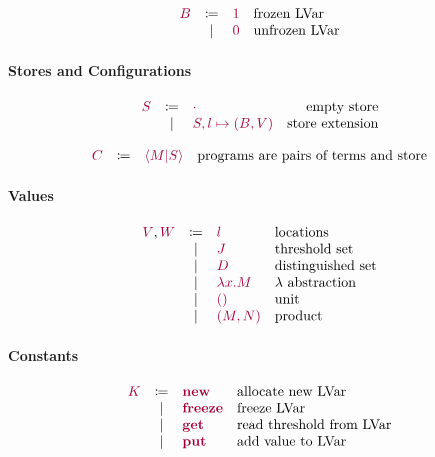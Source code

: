 \documentclass[main.tex]{subfiles}
\begin{document}
\[
\begin{array}{lcll}
  \tm{B}
  & \coloneqq & \tm{1}                        & \text{frozen LVar} \\
  & \sep      & \tm{0}                        & \text{unfrozen LVar} \\
\end{array}
\]

\paragraph{Stores and Configurations}
\[
\begin{array}{lclr}
  \tm{S}
  & \coloneqq & \tm{\emptyenv}                & \text{empty store} \\
  & \sep      & \tm{S, l \mapsto (B, V)}      & \text{store extension} \\
  \end{array}
\]

\[
\begin{array}{lclr}
  \tm{C}
  & \coloneqq & \tm{\config{M}{S}}                & \text{programs are pairs of
                                                    terms and store} \\
  \end{array}
\]

\paragraph{Values}
\[
\begin{array}{lcll}
  \tm{V}, \tm{W}
  & \coloneqq & \tm{l}                        & \text{locations} \\
  & \sep      & \tm{J}                        & \text{threshold set} \\
  & \sep      & \tm{D}                        & \text{distinguished set} \\
  & \sep      & \tm{\lambda x.M}              & \lambda \text{ abstraction} \\
  & \sep      & \tm{\unit}                    & \text{unit} \\
  & \sep      & \tm{\pair{M}{N}}              & \text{product} \\
\end{array}
\]

\paragraph{Constants}
\[
\begin{array}{lcll}
  \tm{K}
  & \coloneqq & \tm{\lvarnew}                        & \text{allocate new LVar} \\
  & \sep      & \tm{\lvarfreeze}                     & \text{freeze LVar} \\
  & \sep      & \tm{\lvarget}                        & \text{read threshold from
                                                       LVar} \\
  & \sep      & \tm{\lvarput}                        & \text{add value to LVar} \\
\end{array}
\]
\end{document}
